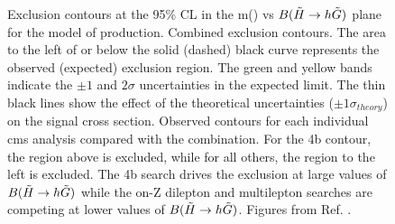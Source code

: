 \begin{figure}[htbp]
	\centering 
	\caption{
	Exclusion contours at the 95\% CL in the m(\ninoone) vs $B(\tilde{H}\rightarrow h \tilde{G})$ plane for the model of \ninoone\ninoone production.
	Combined exclusion contours. The area to the left of or below the solid (dashed) black curve represents the observed (expected) exclusion region. The green and yellow bands indicate the $\pm1$ and $2\sigma$ uncertainties in the expected limit. The thin black lines show the effect of the theoretical uncertainties ($\pm1\sigma_{theory}$) on the signal cross section.
	Observed contours for each individual \gls{cms} analysis compared with the combination. For the 4b contour, the region above is excluded, while for all others, the region to the left is excluded. The 4b search drives the exclusion at large values of $B(\tilde{H}\rightarrow h \tilde{G})$ while the on-Z dilepton and multilepton searches are competing at lower values of $B(\tilde{H}\rightarrow h \tilde{G})$.
	Figures from Ref. \cite{Sirunyan:2018ubx}.
		}
	\label{fig:limits_higgsino_cms}
\end{figure}

